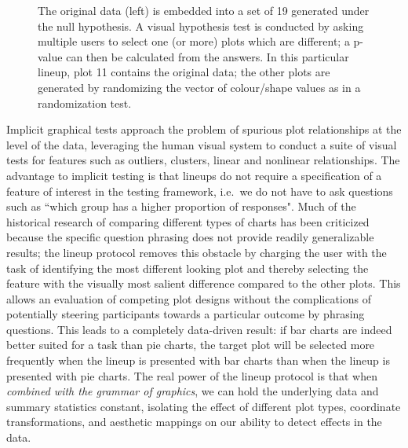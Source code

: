 \documentclass[letterpaper]{ar-1col}\usepackage[]{graphicx}\usepackage[]{color}
\newenvironment{knitrout}{}{} %
\begin{document}
\begin{figure}
\begin{minipage}[c]{.69\textwidth}
\begin{knitrout}
\end{knitrout}
\end{minipage}
\caption{The original data (left) is embedded into a set of 19 generated under the null hypothesis. A visual hypothesis test is conducted by asking multiple users to select one (or more) plots which are different; a p-value can then be calculated from the answers. In this particular lineup, plot 11 contains the original data; the other plots are generated by randomizing the vector of colour/shape values as in a randomization test.}\label{fig:lineup-demo}
\end{figure}

Implicit graphical tests approach the problem of spurious plot relationships at the level of the data, leveraging the human visual system to conduct a suite of visual tests for features such as outliers, clusters, linear and nonlinear relationships.
The advantage to implicit testing is that lineups do not require a specification of a feature of interest in the testing framework, i.e.\  we do not have to ask questions such as ``which group has a higher proportion of responses".
Much of the historical research of comparing different types of charts has been criticized because the specific question phrasing does not provide readily generalizable results; the lineup protocol removes this obstacle by charging the user with the task of identifying the most different looking plot and thereby selecting the feature with the visually most salient difference compared to the other plots.
This allows an evaluation of competing plot designs without the complications of potentially steering participants towards a particular outcome by phrasing questions. This leads to a completely data-driven result: if bar charts are indeed better suited for a task than pie charts, the target plot will be selected more frequently when the lineup is presented with bar charts than when the lineup is presented with pie charts.
The real power of the lineup protocol is that when \emph{combined with the grammar of graphics}, we can hold the underlying data and summary statistics constant, isolating the effect of different plot types, coordinate transformations, and aesthetic mappings on our ability to detect effects in the data.

\end{document}
